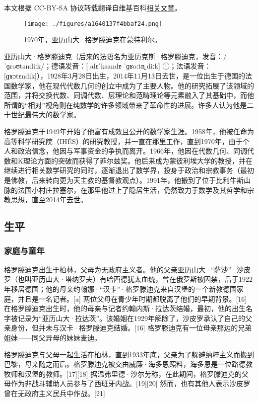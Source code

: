 
本文根据 CC-BY-SA 协议转载翻译自维基百科\href{https://en.wikipedia.org/wiki/Alexander_Grothendieck#Mathematical_work}{相关文章}。

\begin{figure}[ht]
\centering
\texttt{[image: ./figures/a1640137f4bbaf24.png]}
\caption{1970年，亚历山大·格罗滕迪克在蒙特利尔。} \label{fig_AlGr_1}
\end{figure}
亚历山大·格罗滕迪克（后来的法语名为亚历克斯·格罗滕迪克，发音：/ˈɡroʊtəndiːk/；德语发音：[ˌalɛˈksandɐ ˈɡʁoːtn̩ˌdiːk] ⓘ；法语发音：[ɡʁɔtɛndik]），1928年3月28日出生，2014年11月13日去世，是一位出生于德国的法国数学家，他在现代代数几何的创立中成为了主要人物。他的研究拓展了该领域的范围，并将交换代数、同调代数、层理论和范畴理论等元素融入了其基础中，而他所谓的“相对”视角则在纯数学的许多领域带来了革命性的进展。许多人认为他是二十世纪最伟大的数学家。

格罗滕迪克于1949年开始了他富有成效且公开的数学家生涯。1958年，他被任命为高等科学研究院（IHÉS）的研究教授，并一直在那里工作，直到1970年，由于个人和政治信念，他因与军事资金的争执而离开。1966年，他因在代数几何、同调代数和K理论方面的突破而获得了菲尔兹奖。他后来成为蒙彼利埃大学的教授，并在继续进行相关数学研究的同时，逐渐退出了数学界，投身于政治和宗教事务（最初是佛教，后来转向更为天主教的基督教观点）。1991年，他搬到了位于比利牛斯山脉的法国小村庄拉塞尔，在那里他过上了隐居生活，仍然致力于数学及其哲学和宗教思想，直至2014年去世。
\subsection{生平}  
\subsubsection{家庭与童年}  
格罗滕迪克出生于柏林，父母为无政府主义者。他的父亲亚历山大·“萨沙”·沙皮罗（也叫亚历山大·塔纳罗夫）有哈西德犹太血统，曾在俄罗斯被囚禁，后于1922年移居德国；他的母亲约翰娜·“汉卡”·格罗滕迪克来自汉堡的一个新教德国家庭，并且是一名记者。[a] 两位父母在青少年时期都脱离了他们的早期背景。[16] 在格罗滕迪克出生时，他的母亲与记者约翰内斯·拉达茨结婚，最初，他的出生名字被记录为“亚历山大·拉达茨”。该婚姻在1929年解除了，沙皮罗承认了自己的父亲身份，但并未与汉卡·格罗滕迪克结婚。[16] 格罗滕迪克有一位母亲那边的兄弟姐妹——同父异母的妹妹麦迪。

格罗滕迪克与父母一起生活在柏林，直到1933年底，父亲为了躲避纳粹主义而搬到巴黎，母亲随之而后。格罗滕迪克被交由威廉·海多恩照料，海多恩是一位路德教牧师和汉堡的教师。[17][18] 据温弗里德·沙尔劳称，在此期间，格罗滕迪克的父母作为非战斗辅助人员参与了西班牙内战。[19][20] 然而，也有其他人表示沙皮罗曾在无政府主义民兵中作战。[21]
